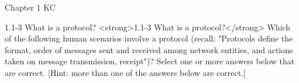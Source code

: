 \documentclass[a4paper]{article}
\begin{document}
\begin{quiz}{Chapter 1 KC}




\begin{multi}[points=1,multiple]{1.1-3 What is a protocol?}
<strong>1.1-3 What is a protocol?</strong> 
Which of the following human scenarios involve a protocol (recall: "Protocols define the format, order of messages sent and received among network entities, and actions taken on message transmission, receipt")? Select one or more answers below that are correct. [Hint: more than one of the answers below are correct.]


\end{multi}
\end{quiz}
\end{document}
